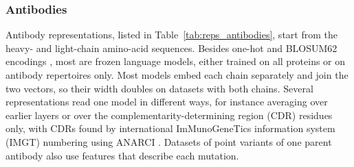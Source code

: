 \subsubsection{Antibodies}
Antibody representations, listed in Table~\ref{tab:reps_antibodies}, start from the heavy- and light-chain amino-acid sequences. Besides one-hot and BLOSUM62 encodings \citep{Henikoff1992}, most are frozen language models, either trained on all proteins or on antibody repertoires only. Most models embed each chain separately and join the two vectors, so their width doubles on datasets with both chains. Several representations read one model in different ways, for instance averaging over earlier layers or over the complementarity-determining region (CDR) residues only, with CDRs found by international ImMunoGeneTics information system (IMGT) numbering \citep{Lefranc2003} using ANARCI \citep{Dunbar2016ANARCI}. Datasets of point variants of one parent antibody also use features that describe each mutation.

